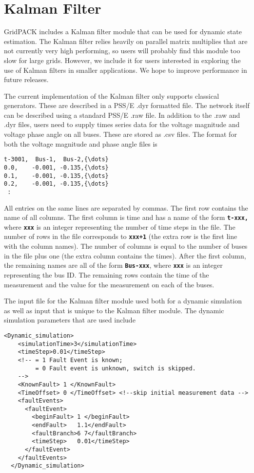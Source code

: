 \section{Kalman Filter}

GridPACK includes a Kalman filter module that can be used for dynamic state estimation. The Kalman filter relies heavily on parallel matrix multiplies that are not currently very high performing, so users will probably find this module too slow for large grids. However, we include it for users interested in exploring the use of Kalman filters in smaller applications. We hope to improve performance in future releases.

The current implementation of the Kalman filter only supports classical generators. These are described in a PSS/E .dyr formatted file. The network itself can be described using a standard PSS/E .raw file. In addition to the .raw and .dyr files, users need to supply times series data for the voltage magnitude and voltage phase angle on all buses. These are stored as .csv files. The format for both the voltage magnitude and phase angle files is

{
\color{red}
\begin{Verbatim}[fontseries=b]
t-3001,  Bus-1,  Bus-2,{\dots}
0.0,    -0.001, -0.135,{\dots}
0.1,    -0.001, -0.135,{\dots}
0.2,    -0.001, -0.135,{\dots}
 :
\end{Verbatim}
}

All entries on the same lines are separated by commas. The first row contains the name of all columns. The first column is time and has a name of the form \texttt{\textbf{t-xxx,}} where \texttt{\textbf{xxx}} is an integer representing the number of time steps in the file. The number of rows in the file corresponds to \texttt{\textbf{xxx+1}} (the extra row is the first line with the column names). The number of columns is equal to the number of buses in the file plus one (the extra column contains the times). After the first column, the remaining names are all of the form \texttt{\textbf{Bus-xxx}}, where \texttt{\textbf{xxx}} is an integer representing the bus ID. The remaining rows contain the time of the measurement and the value for the measurement on each of the buses.

The input file for the Kalman filter module used both for a dynamic simulation as well as input that is unique to the Kalman filter module. The dynamic simulation parameters that are used include

{
\color{blue}
\begin{Verbatim}[fontseries=b]
  <Dynamic_simulation>
    <simulationTime>3</simulationTime>
    <timeStep>0.01</timeStep>
    <!-- = 1 Fault Event is known; 
         = 0 Fault event is unknown, switch is skipped. 
    -->
    <KnownFault> 1 </KnownFault>
    <TimeOffset> 0 </TimeOffset> <!--skip initial measurement data -->
    <faultEvents>
      <faultEvent>
        <beginFault> 1 </beginFault>
        <endFault>   1.1</endFault>
        <faultBranch>6 7</faultBranch>
        <timeStep>   0.01</timeStep>
      </faultEvent>
    </faultEvents>
  </Dynamic_simulation>
\end{Verbatim}
}

